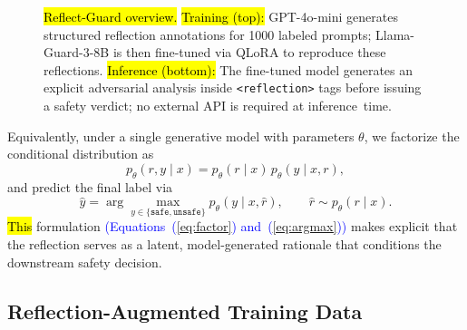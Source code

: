 \documentclass[superintelligence,article,accept,moreauthors]{Definitions/mdpi}
\newcommand{\authchg}[1]{\textcolor{blue}{#1}}
\begin{document}
\begin{figure}[H]
{}%
\caption{\hl{Reflect-Guard overview.}
  \hl{Training (top):}
 GPT-4o-mini generates structured reflection annotations
  for 1000 labeled prompts; Llama-Guard-3-8B is then fine-tuned via QLoRA to
  reproduce these reflections.
  \hl{Inference (bottom):} The fine-tuned model generates an explicit adversarial
  analysis inside \texttt{<reflection>} tags before issuing a safety verdict; no
  external API is required at \mbox{inference time.}\label{fig:pipeline}}
\end{figure}




Equivalently, under a single generative model with parameters $\theta$, we factorize the conditional distribution as
\begin{equation}
  p_{\theta}(r, y \mid x) = p_{\theta}(r \mid x) \, p_{\theta}(y \mid x, r),\label{eq:factor}
\end{equation}
and predict the final label via
\begin{equation}
  \hat{y} = \arg\max_{y \in \{\texttt{safe},\texttt{unsafe}\}} p_{\theta}(y \mid x, \hat{r}),
  \qquad \hat{r} \sim p_{\theta}(r \mid x).\label{eq:argmax}
\end{equation}
\hl{This}
 formulation \authchg{(Equations~(\ref{eq:factor}) and~(\ref{eq:argmax}))} makes explicit that the reflection serves as a latent, model-generated rationale that conditions the downstream safety decision.

\subsection{Reflection-Augmented Training Data}
\label{sec:synthesis}
\end{document}
